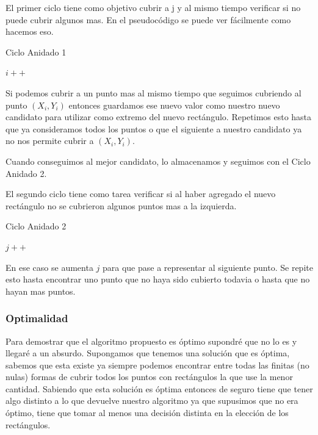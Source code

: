 El primer ciclo tiene como objetivo cubrir a j y al mismo tiempo verificar si no puede cubrir algunos mas. En el pseudocódigo se puede ver fácilmente como hacemos eso.

\begin{algorithm}[H]
\begin{algorithmic}

\caption{Ciclo Anidado 1}

	\State $i++$
\EndWhile

\end{algorithmic}
\end{algorithm}

Si podemos cubrir a un punto mas al mismo tiempo que seguimos cubriendo al punto $(X_i,Y_i)$ entonces guardamos ese nuevo valor como nuestro nuevo candidato para utilizar como extremo del nuevo rectángulo. Repetimos esto hasta que ya consideramos todos los puntos o que el siguiente a nuestro candidato ya no nos permite cubrir a $(X_i,Y_i)$.

Cuando conseguimos al mejor candidato, lo almacenamos y seguimos con el Ciclo Anidado 2.

El segundo ciclo tiene como tarea verificar si al haber agregado el nuevo rectángulo no se cubrieron algunos puntos mas a la izquierda.

\begin{algorithm}[H]
\begin{algorithmic}

\caption{Ciclo Anidado 2}

	\State $j++$
\EndWhile

\end{algorithmic}
\end{algorithm}

En ese caso se aumenta $j$ para que pase a representar al siguiente punto. Se repite esto hasta encontrar uno punto que no haya sido cubierto todavia o hasta que no hayan mas puntos.

\subsubsection{Optimalidad}

Para demostrar que el algoritmo propuesto es óptimo supondré que no lo es y llegaré a un absurdo. Supongamos que tenemos una solución que es óptima, sabemos que esta existe ya siempre podemos encontrar entre todas las finitas (no nulas) formas de cubrir todos los puntos con rectángulos la que use la menor cantidad. Sabiendo que esta solución es óptima entonces de seguro tiene que tener algo distinto a lo que devuelve nuestro algoritmo ya que supusimos que no era óptimo, tiene que tomar al menos una decisión distinta en la elección de los rectángulos.

